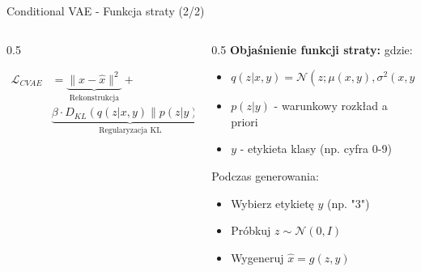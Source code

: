\documentclass{beamer}
\begin{document}
\begin{frame}{Conditional VAE - Funkcja straty (2/2)}
    \begin{columns}
        \begin{column}{0.5\textwidth}
            \begin{tcolorbox}[colback=yellow!10!white, colframe=black!60, boxrule=0.5pt, arc=3mm]
                \begin{align*}
                    \mathcal{L}_{CVAE} & = \underbrace{\|x - \hat{x}\|^2}_{\text{Rekonstrukcja}} +                     \\
                                       & \underbrace{\beta \cdot D_{KL}(q(z|x,y) \| p(z|y))}_{\text{Regularyzacja KL}}
                \end{align*}
            \end{tcolorbox}
        \end{column}
        \begin{column}{0.5\textwidth}
            \textbf{Objaśnienie funkcji straty:}
            \medskip
            gdzie:
            \begin{itemize}
                \item $q(z|x,y) = \mathcal{N}(z; \mu(x,y), \sigma^2(x,y))$
                \item $p(z|y)$ - warunkowy rozkład a priori
                \item $y$ - etykieta klasy (np. cyfra 0-9)
            \end{itemize}

            \medskip
            Podczas generowania:
            \begin{itemize}
                \item Wybierz etykietę $y$ (np. "3")
                \item Próbkuj $z \sim \mathcal{N}(0, I)$
                \item Wygeneruj $\hat{x} = g(z, y)$
            \end{itemize}
        \end{column}
    \end{columns}
\end{frame}
\end{document}
